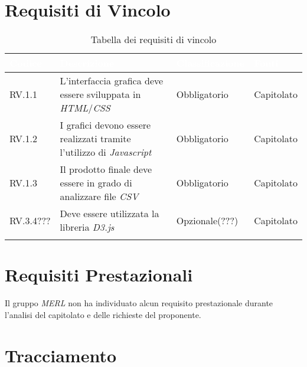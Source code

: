 \section{Requisiti di Vincolo}
\begin{center}
  \centering
  \begin{longtable}{|L{1,5cm}|C{5,5cm}|C{3cm}|C{2cm}|}
    \hline
    \textcolor[HTML]{FFFFFF}{\textbf{Codice}} & \textcolor[HTML]{FFFFFF}{\textbf{Descrizione}} & \textcolor[HTML]{FFFFFF}{\textbf{Classificazione}} & \textcolor[HTML]{FFFFFF}{\textbf{Fonti}}
    \\ \hline
    RV.1.1 & L'interfaccia grafica deve essere sviluppata in \textit{HTML}/\textit{CSS} & Obbligatorio & Capitolato \\ \hline
    RV.1.2 & I grafici devono essere realizzati tramite l'utilizzo di \textit{Javascript} & Obbligatorio & Capitolato \\ \hline
    RV.1.3 & Il prodotto finale deve essere in grado di analizzare file \textit{CSV} & Obbligatorio & Capitolato \\ \hline
    RV.3.4??? & Deve essere utilizzata la libreria \textit{D3.js} & Opzionale(???) & Capitolato \\ \hline

    \caption{Tabella dei requisiti di vincolo}
  \end{longtable}
\end{center}

\section{Requisiti Prestazionali}
Il gruppo \textit{MERL} non ha individuato alcun requisito prestazionale durante l'analisi del capitolato e delle richieste del proponente.


\section{Tracciamento}

